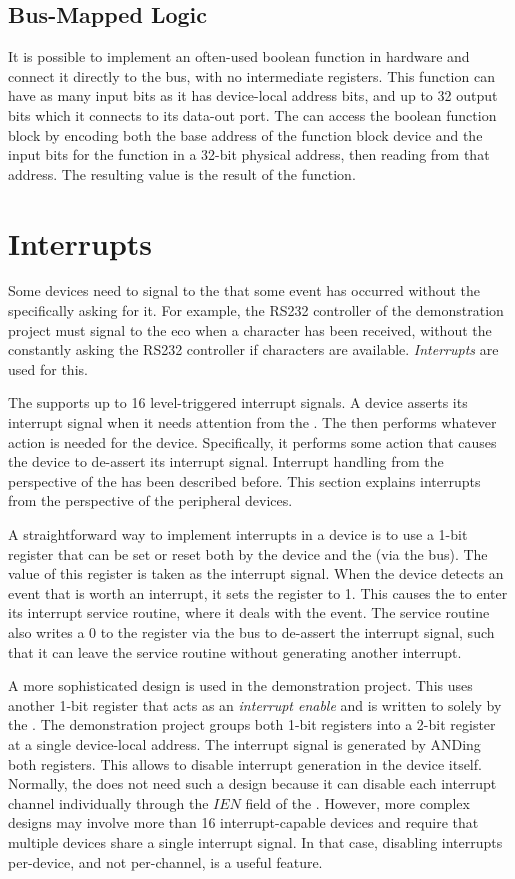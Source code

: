 \subsection{Bus-Mapped Logic}

It is possible to implement an often-used boolean function in hardware and connect it directly to the bus, with no intermediate registers. This function can have as many input bits as it has device-local address bits, and up to 32 output bits which it connects to its data-out port. The \eco can access the boolean function block by encoding both the base address of the function block device and the input bits for the function in a 32-bit physical address, then reading from that address. The resulting value is the result of the function.

\section{Interrupts}

Some devices need to signal to the \eco that some event has occurred without the \eco specifically asking for it. For example, the RS232 controller of the demonstration project must signal to the eco when a character has been received, without the \eco constantly asking the RS232 controller if characters are available. {\it Interrupts} are used for this.

The \eco supports up to 16 level-triggered interrupt signals. A device asserts its interrupt signal when it needs attention from the \ecox. The \eco then performs whatever action is needed for the device. Specifically, it performs some action that causes the device to de-assert its interrupt signal. Interrupt handling from the perspective of the \eco has been described before. This section explains interrupts from the perspective of the peripheral devices.

A straightforward way to implement interrupts in a device is to use a 1-bit register that can be set or reset both by the device and the \eco (via the bus). The value of this register is taken as the interrupt signal. When the device detects an event that is worth an interrupt, it sets the register to 1. This causes the \eco to enter its interrupt service routine, where it deals with the event. The service routine also writes a 0 to the register via the bus to de-assert the interrupt signal, such that it can leave the service routine without generating another interrupt.

A more sophisticated design is used in the demonstration project. This uses another 1-bit register that acts as an {\it interrupt enable} and is written to solely by the \ecox. The demonstration project groups both 1-bit registers into a 2-bit register at a single device-local address. The interrupt signal is generated by ANDing both registers. This allows to disable interrupt generation in the device itself. Normally, the \eco does not need such a design because it can disable each interrupt channel individually through the $IEN$ field of the \pswx. However, more complex designs may involve more than 16 interrupt-capable devices and require that multiple devices share a single interrupt signal. In that case, disabling interrupts per-device, and not per-channel, is a useful feature.
